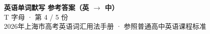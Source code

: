 \documentclass[10pt,a4paper]{article}
\begin{document}
\pagestyle{plain}

\begin{center}
{\LARGE\bfseries 英语单词默写 \quad 参考答案（英 $\to$ 中）}\\[0.22em]
{\large T 字母 · 第 4 / 5 份}\\[0.18em]
{\small 2026年上海市高考英语词汇用法手册 · 参照普通高中英语课程标准}
\end{center}

\vspace{0.2em}
\noindent{\color{rulegray}\rule{\textwidth}{0.8pt}}

\vspace{0.35em}

\vspace{0.25em}
\renewcommand{\arraystretch}{1.32}
\end{document}
